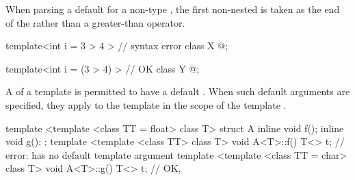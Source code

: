 %
\pnum
When parsing a
default
for a non-type
,
the first non-nested
\tcode{>}
is taken as the end of the
rather than a greater-than operator.
\begin{example}
\begin{codeblock}
template<int i = 3 > 4 >        // syntax error
class X { @\commentellip@ };

template<int i = (3 > 4) >      // OK
class Y { @\commentellip@ };
\end{codeblock}
\end{example}

\pnum
A
of a template
is permitted to have a default
.
When such default arguments are specified, they apply to the template
in the scope of the template
.
\begin{example}
\begin{codeblock}
template <template <class TT = float> class T> struct A {
  inline void f();
  inline void g();
};
template <template <class TT> class T> void A<T>::f() {
  T<> t;            // error:  has no default template argument
}
template <template <class TT = char> class T> void A<T>::g() {
  T<> t;            // OK, 
}
\end{codeblock}
\end{example}

